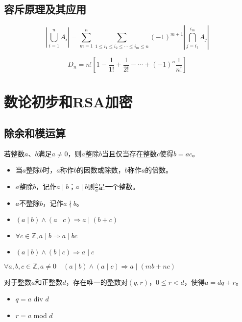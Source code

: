 \documentclass[cyan]{elegantnote}
\begin{document}
\section{容斥原理及其应用}
\begin{newthem}[容斥原理]
   \[\left|\bigcup_{i=1}^nA_i\right| =\sum_{m=1}^n\sum_{1\leq{}i_1\leq{}i_2\leq{}\cdots\leq{}i_m\leq{}n}(-1)^{m+1}\left|\bigcap_{j=i_1}^{i_m}A_j\right|\]
\end{newthem}
\begin{newthem}[全错位排列]
   \[D_n=n!\left[1-\frac{1}{1!}+\frac{1}{2!}-\cdots+(-1)^n\frac{1}{n!}\right]\]
\end{newthem}
\chapter{数论初步和RSA加密}
\section{除余和模运算}
\begin{newdef}[整除]
   若整数$a$、$b$满足$a\neq{}0$，则$a$整除$b$当且仅当存在整数$c$使得$b=ac$。
   \begin{itemize}
      \item 当$a$整除$b$时，$a$称作$b$的因数或除数，$b$称作$a$的倍数。
      \item $a$整除$b$，记作$a\mid b$；$a\mid b$则$\frac{b}{a}$是一个整数。
      \item $a$不整除$b$，记作$a\nmid b$。
   \end{itemize}
\end{newdef}
\begin{newthem}
   \begin{itemize}
      \item $(a\mid b)\land(a\mid c)\Rightarrow a\mid(b+c)$
      \item $\forall c\in \mathbb{Z},a\mid b \Rightarrow a\mid bc$
      \item $(a\mid b)\land(b\mid c)\Rightarrow a\mid c$
   \end{itemize}
\end{newthem}
\begin{newthem}
   $\forall a,b,c \in\mathbb{Z},a\neq0 \quad (a\mid b)\land(a\mid c)\Rightarrow a\mid(mb+nc)$
\end{newthem}
\begin{newthem}[整除定理]
   对于整数$a$和正整数$d$，存在唯一的整数对$(q,r)$，$0\leq{}r<d$，使得$a=dq+r$。
   \begin{itemize}
      \item $q = a$ div $d$
      \item $r = a$ mod $d$
   \end{itemize}
\end{newthem}
\end{document}
